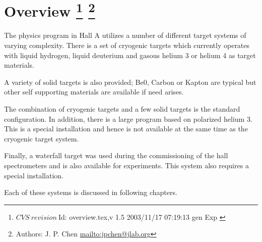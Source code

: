 \section[Overview]{ Overview
\footnote{
  $CVS~revision~ $Id: overview.tex,v 1.5 2003/11/17 07:19:13 gen Exp $ $ }
\footnote{Authors: J. P. Chen \url{mailto:jpchen@jlab.org}}
}

The physics program in Hall A utilizes a number of different
target systems of varying complexity. There is a set of
cryogenic targets which currently operates with liquid hydrogen, liquid
deuterium and gasous helium 3 or helium 4
as target materials.

A variety of solid targets is also provided; Be0, Carbon or
Kapton are typical but other self supporting materials are available if need arises.

The combination of cryogenic targets and a few solid targets is
the standard configuration. In addition,
there is a large program based on polarized helium 3. This
is a special installation and hence is not available at the same
time as the cryogenic target system.

Finally, a waterfall target was used during the commissioning of
the hall spectrometers and is also available for experiments. This system also 
requires a special installation.

Each of these systems is discussed in following chapters.
%
%
%
%
%
